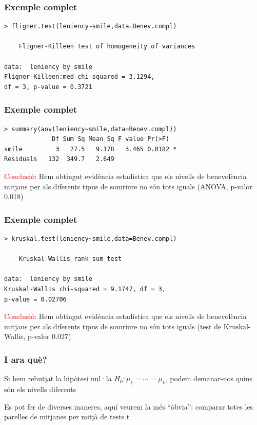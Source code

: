 \documentclass[12pt,t]{beamer}
\newcommand{\red}[1]{\textcolor{red}{#1}}
\theoremstyle{plain}
\theoremstyle{definition}
\begin{document}
\begin{frame}[fragile]
\frametitle{Exemple complet}

\begin{lstlisting}
> fligner.test(leniency~smile,data=Benev.compl)

	Fligner-Killeen test of homogeneity of variances

data:  leniency by smile
Fligner-Killeen:med chi-squared = 3.1294, 
df = 3, p-value = 0.3721
\end{lstlisting}
\end{frame}


\begin{frame}[fragile]
\frametitle{Exemple complet}

\begin{lstlisting}
> summary(aov(leniency~smile,data=Benev.compl))
             Df Sum Sq Mean Sq F value Pr(>F)  
smile         3   27.5   9.178   3.465 0.0182 *
Residuals   132  349.7   2.649                 
\end{lstlisting}\medskip

\red{Conclusió}: Hem obtingut evidència estadística que els nivells de benevolència mitjans per als diferents tipus de somriure no són tots iguals (ANOVA, p-valor 0.018)
\end{frame}

\begin{frame}[fragile]
\frametitle{Exemple complet}

\begin{lstlisting}
> kruskal.test(leniency~smile,data=Benev.compl)  

	Kruskal-Wallis rank sum test

data:  leniency by smile
Kruskal-Wallis chi-squared = 9.1747, df = 3, 
p-value = 0.02706
\end{lstlisting}\medskip

\red{Conclusió}: Hem obtingut evidència estadística que els nivells de benevolència mitjans per als diferents tipus de somriure no són tots iguals (test de Kruskal-Wallis, p-valor 0.027)
\end{frame}


\begin{frame}
\frametitle{I ara què?}\pause

Si hem rebutjat la hipòtesi nul·la $H_0:\mu_1=\cdots =\mu_k$, podem demanar-nos
quins són els nivells diferents
\medskip

Es pot fer de diverses maneres, aquí veurem la més ``òbvia'': comparar totes les parelles de mitjanes per mitjà de tests t 
\end{frame}
\end{document}
